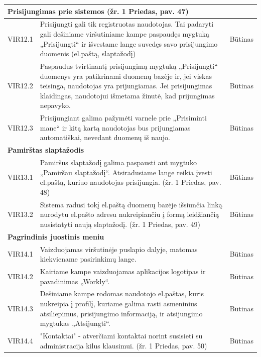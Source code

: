 \documentclass{VUMIFPSkursinis}
\begin{document}
\begin{table}[H]
\centering
\normalsize
\begin{tabular}{|p{2cm}|p{10cm}|p{3cm}|}
\hline
\multicolumn{3}{|l|}{\textbf{Prisijungimas prie sistemos  (žr. 1 Priedas, pav. 47)}} \\ \hline
VIR12.1 & \multicolumn{1}{m{10cm}|}{Prisijungti gali tik registruotas naudotojas. Tai padaryti gali dešiniame viršutiniame kampe paspaudęs mygtuką  „Prisijungti“ ir išvestame lange suvedęs savo prisijungimo duomenis (el.paštą, slaptažodį)} & Būtinas \\ \hline
VIR12.2 & \multicolumn{1}{m{10cm}|}{Paspaudus tvirtinantį prisijungimą  mygtuką  „Prisijungti“ duomenys yra patikrinami duomenų bazėje ir, jei viskas teisinga, naudotojas yra prijungiamas. Jei prisijungimas klaidingas, naudotojui išmetama žinutė, kad prijungimas nepavyko.} & Būtinas \\ \hline
VIR12.3 & \multicolumn{1}{m{10cm}|}{Prisijungiant galima pažymėti varnele prie „Prisiminti mane“ ir kitą kartą naudotojas bus prijungiamas automatiškai, nevedant duomenų iš naujo.} & Būtinas \\ \hline
\multicolumn{3}{|l|}{\textbf{Pamirštas slaptažodis}} \\ \hline
VIR13.1 & \multicolumn{1}{m{10cm}|}{Pamiršus slaptažodį galima paspausti ant mygtuko „Pamiršau slaptažodį“. Atsiradusiame lange reikia įvesti el.paštą, kuriuo naudotojas prisijungia. (žr. 1 Priedas, pav. 48)} & Būtinas \\ \hline
VIR13.2 & \multicolumn{1}{m{10cm}|}{Sistema radusi tokį el.paštą duomenų bazėje išsiunčia linką nurodytu el.pašto adresu nukreipiančiu į formą leidžiančią nusistatyti naują slaptažodį. (žr. 1 Priedas, pav. 49)} & Būtinas \\ \hline
\multicolumn{3}{|l|}{\textbf{Pagrindinis juostinis meniu}} \\ \hline
VIR14.1 & \multicolumn{1}{m{10cm}|}{Vaizduojamas viršutinėje puslapio dalyje, matomas kiekviename pasirinkimų lange.} & Būtinas \\ \hline
VIR14.2 & \multicolumn{1}{m{10cm}|}{Kairiame kampe vaizduojamas aplikacijos logotipas ir pavadinimas „Workly“.} & Būtinas \\ \hline
VIR14.3 & \multicolumn{1}{m{10cm}|}{Dešiniame kampe rodomas naudotojo el.paštas, kuris nukreipia į profilį, kuriame galima rasti asmeninius atsiliepimus, prisijungimo informaciją, ir atsijungimo mygtukas „Atsijungti“.} & Būtinas \\ \hline
VIR14.4 & \multicolumn{1}{m{10cm}|}{"Kontaktai" - atverčiami kontaktai norint susisieti su administracija kilus klausimui.  (žr. 1 Priedas, pav. 50)} & Būtinas \\ \hline

\end{tabular}
\end{table}
\end{document}
